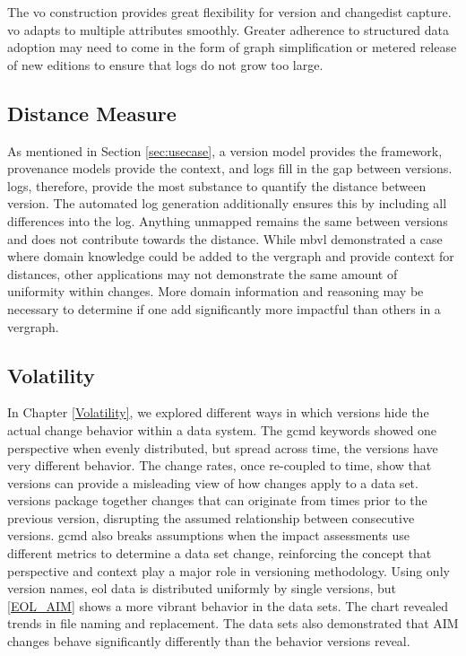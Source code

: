 The \gls{vo} construction provides great flexibility for \gls{version} and \gls{changedist} capture.
\gls{vo} adapts to multiple \glspl{attribute} smoothly.
Greater adherence to structured data adoption may need to come in the form of graph simplification or metered release of new editions to ensure that \glspl{log} do not grow too large.

\subsection{Distance Measure}

As mentioned in Section \ref{sec:usecase}, a version model provides the framework, provenance models provide the context, and \glspl{log} fill in the gap between \glspl{version}.
\glspl{log}, therefore, provide the most substance to quantify the distance between \gls{version}.
The automated \gls{log} generation additionally ensures this by including all differences into the \gls{log}.
Anything unmapped remains the same between \glspl{version} and does not contribute towards the distance.
While \gls{mbvl} demonstrated a case where domain knowledge could be added to the \gls{vergraph} and provide context for distances, other applications may not demonstrate the same amount of uniformity within changes.
More domain information and reasoning may be necessary to determine if one \gls{add} significantly more impactful than others in a \gls{vergraph}.


\subsection{Volatility}

In Chapter \ref{Volatility}, we explored different ways in which \glspl{version} hide the actual \gls{change} behavior within a data system.
The \gls{gcmd} keywords showed one perspective when evenly distributed, but spread across time, the \glspl{version} have very different behavior.
The change rates, once re-coupled to time, show that \glspl{version} can provide a misleading view of how changes apply to a data set.
\glspl{version} package together \glspl{change} that can originate from times prior to the previous \gls{version}, disrupting the assumed relationship between consecutive \glspl{version}.
\gls{gcmd} also breaks assumptions when the impact assessments use different metrics to determine a data set change, reinforcing the concept that perspective and context play a major role in versioning methodology.
Using only \gls{version} names, \gls{eol} data is distributed uniformly by single \glspl{version}, but \ref{EOL_AIM} shows a more vibrant behavior in the data sets.
The chart revealed trends in file naming and replacement.
The data sets also demonstrated that \gls{AIM} changes behave significantly differently than the behavior \glspl{version} reveal.